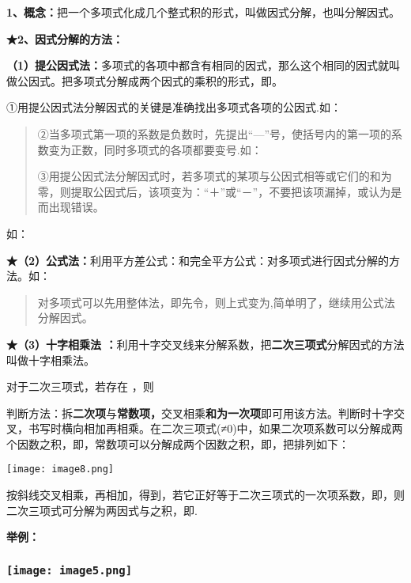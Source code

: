 \textbf{1、概念：}把一个多项式化成几个整式积的形式，叫做因式分解，也叫分解因式。

\textbf{★2、因式分解的方法：}

\textbf{（1）提公因式法：}多项式的各项中都含有相同的因式，那么这个相同的因式就叫做公因式。把多项式分解成两个因式的乘积的形式，即。

①用提公因式法分解因式的关键是准确找出多项式各项的公因式.如：

\begin{quote}
②当多项式第一项的系数是负数时，先提出``---''号，使括号内的第一项的系数变为正数，同时多项式的各项都要变号.如：

③用提公因式法分解因式时，若多项式的某项与公因式相等或它们的和为零，则提取公因式后，该项变为：``＋''或``－''，不要把该项漏掉，或认为是而出现错误。
\end{quote}

如：

\textbf{★（2）公式法：}利用平方差公式：和完全平方公式：对多项式进行因式分解的方法。如：

\begin{quote}
对多项式可以先用整体法，即先令，则上式变为,简单明了，继续用公式法分解因式。
\end{quote}

\textbf{★（3）十字相乘法
：}利用十字交叉线来分解系数，把\textbf{二次三项式}分解因式的方法叫做十字相乘法。

对于二次三项式，若存在 ，则

判断方法：拆\textbf{二次项}与\textbf{常数项，}交叉相乘\textbf{和为一次项}即可用该方法。判断时十字交叉，书写时横向相加再相乘。在二次三项式(≠0)中，如果二次项系数可以分解成两个因数之积，即，常数项可以分解成两个因数之积，即，把排列如下：

\texttt{[image: image8.png]}

按斜线交叉相乘，再相加，得到，若它正好等于二次三项式的一次项系数，即，则二次三项式可分解为两因式与之积，即.

\textbf{举例：}

\hypertarget{ux5b66ux79d1ux7f51www.zxxk.com--ux6559ux80b2ux8d44ux6e90ux95e8ux6237ux63d0ux4f9bux8bd5ux9898ux8bd5ux5377ux6559ux6848ux8bfeux4ef6ux6559ux5b66ux8bbaux6587ux7d20ux6750ux7b49ux5404ux7c7bux6559ux5b66ux8d44ux6e90ux5e93ux4e0bux8f7dux8fd8ux6709ux5927ux91cfux4e30ux5bccux7684ux6559ux5b66ux8d44ux8baf-4}{%
\subsubsection{\texorpdfstring{\protect\texttt{[image: image5.png]}}{学科网(www.zxxk.com)-\/-教育资源门户，提供试题试卷、教案、课件、教学论文、素材等各类教学资源库下载，还有大量丰富的教学资讯！}}\label{ux5b66ux79d1ux7f51www.zxxk.com--ux6559ux80b2ux8d44ux6e90ux95e8ux6237ux63d0ux4f9bux8bd5ux9898ux8bd5ux5377ux6559ux6848ux8bfeux4ef6ux6559ux5b66ux8bbaux6587ux7d20ux6750ux7b49ux5404ux7c7bux6559ux5b66ux8d44ux6e90ux5e93ux4e0bux8f7dux8fd8ux6709ux5927ux91cfux4e30ux5bccux7684ux6559ux5b66ux8d44ux8baf-4}}

